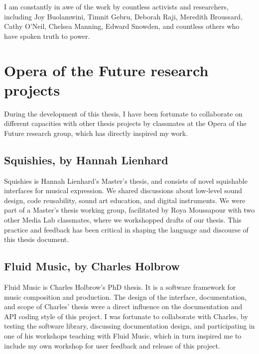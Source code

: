 I am constantly in awe of the work by countless activists and researchers, including Joy Buolamwini, Timnit Gebru, Deborah Raji, Meredith Broussard, Cathy O'Neil, Chelsea Manning, Edward Snowden, and countless others who have spoken truth to power.

\section{Opera of the Future research projects}

During the development of this thesis, I have been fortunate to collaborate on different capacities with other thesis projects by classmates at the Opera of the Future research group, which has directly inspired my work.

\subsection{Squishies, by Hannah Lienhard}

Squishies is Hannah Lienhard's Master's thesis, and consists of novel squishable interfaces for musical expression. We shared discussions about low-level sound design, code reusability, sound art education, and digital instruments. We were part of a Master's thesis working group, facilitated by Roya Moussapour with two other Media Lab classmates, where we workshopped drafts of our thesis. This practice and feedback has been critical in shaping the language and discourse of this thesis document.

\subsection{Fluid Music, by Charles Holbrow}

Fluid Music is Charles Holbrow's PhD thesis. It is a software framework for music composition and production. The design of the interface, documentation, and scope of Charles' thesis were a direct influence on the documentation and API coding style of this project. I was fortunate to collaborate with Charles, by testing the software library, discussing documentation design, and participating in one of his workshops teaching with Fluid Music, which in turn inspired me to include my own workshop for user feedback and release of this project.
